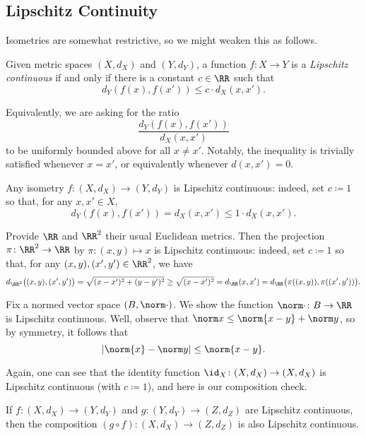 \documentclass[../notes.tex]{subfiles}
\begin{document}
\subsection{Lipschitz Continuity}
Isometries are somewhat restrictive, so we might weaken this as follows.
\begin{defihelper} \label{defi:lipcont} 
	Given metric spaces $(X,d_X)$ and $(Y,d_Y)$, a function $f\colon X\to Y$ is a \textit{Lipschitz continuous} if and only if there is a constant $c\in\RR$ such that
	\[d_Y(f(x),f(x'))\le c\cdot d_X(x,x').\]
\end{defihelper}
\begin{remark} \label{rem:lipasratio}
	Equivalently, we are asking for the ratio
	\[\frac{d_Y(f(x),f(x'))}{d_X(x,x')}\]
	to be uniformly bounded above for all $x\ne x'$. Notably, the inequality is trivially satisfied whenever $x=x'$, or equivalently whenever $d(x,x')=0$.
\end{remark}
\begin{example}
	Any isometry $f\colon(X,d_X)\to(Y,d_Y)$ is Lipschitz continuous: indeed, set $c\coloneqq1$ so that, for any $x,x'\in X$,
	\[d_Y(f(x),f(x'))=d_X(x,x')\le1\cdot d_X(x,x').\]
\end{example}
\begin{example} \label{ex:projectislip}
	Provide $\RR$ and $\RR^2$ their usual Euclidean metrics. Then the projection $\pi\colon\RR^2\to\RR$ by $\pi\colon(x,y)\mapsto x$ is Lipschitz continuous: indeed, set $c\coloneqq1$ so that, for any $(x,y),(x',y')\in\RR^2$, we have
	\[d_{\RR^2}\big((x,y),(x',y')\big)=\sqrt{(x-x')^2+(y-y')^2}\ge\sqrt{(x-x')^2}=d_\RR(x,x')=d_\RR\big(\pi((x,y)),\pi((x',y'))\big).\]
\end{example}
\begin{example} \label{ex:norm-is-cont}
	Fix a normed vector space $(B,\norm\cdot)$. We show the function $\norm\cdot\colon B\to\RR$ is Lipschitz continuous. Well, observe that $\norm x\le\norm{x-y}+\norm y$, so by symmetry, it follows that
	\[|\norm{x}-\norm y|\le\norm{x-y}.\]
\end{example}
Again, one can see that the identity function ${\id_X}\colon(X,d_X)\to(X,d_X)$ is Lipschitz continuous (with $c\coloneqq1$), and here is our composition check.
\begin{lemma}
	If $f\colon(X,d_X)\to(Y,d_Y)$ and $g\colon(Y,d_Y)\to(Z,d_Z)$ are Lipschitz continuous, then the composition $(g\circ f)\colon(X,d_X)\to(Z,d_Z)$ is also Lipschitz continuous.
\end{lemma}
\end{document}
